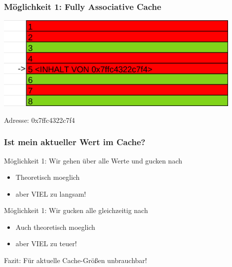 \documentclass{beamer}
\begin{document}
\begin{frame}
\frametitle{M\"oglichkeit 1: Fully Associative Cache}
\centerline{\includegraphics[width=12cm]{fac2.png}}
Adresse: 0x7ffc4322c7f4
\end{frame}

%
\begin{frame}
\frametitle{Ist mein aktueller Wert im Cache?}
\begin{block}{M\"oglichkeit 1: Wir gehen \"uber alle Werte und gucken nach}
\begin{itemize}

\item Theoretisch moeglich

\item aber VIEL zu langsam!
\end{itemize}
\end{block}

\begin{block}{M\"oglichkeit 1: Wir gucken alle gleichzeitig nach}
\begin{itemize}

\item Auch theoretisch moeglich

\item aber VIEL zu teuer!
\end{itemize}

\end{block}
\begin{block}{Fazit: F\"ur aktuelle Cache-Gr\"o\ss{}en unbrauchbar!}
\end{block}
\end{frame}
\end{document}
